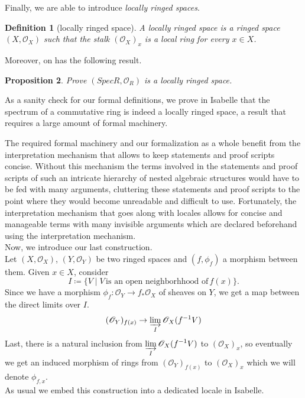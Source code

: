 \documentclass[12pt]{scrartcl}
\newtheorem{proposition}{Proposition}[section]
\newtheorem{definition}[proposition]{Definition}
\begin{document}

Finally, we are able to introduce \emph{locally ringed spaces}.

\begin{definition}[locally ringed space]
	A locally ringed space is a ringed space $(X, \mathscr{O}_X)$ such that the stalk $(\mathscr{O}_X)_x$ is a local ring for every $x \in X$.
\end{definition}


Moreover, on has the following result.

\begin{proposition}
	Prove $(Spec R, \mathscr{O}_R)$ is a locally ringed space.
\end{proposition}

As a sanity check for our formal definitions, we prove in Isabelle that the spectrum of a commutative ring is indeed a locally ringed space, a result that requires a large amount of formal machinery.


The required formal machinery and our formalization as a whole benefit from the interpretation mechanism that allows to keep statements and proof scripts concise. Without this mechanism the terms involved in the statements and proof scripts of such an intricate hierarchy of nested algebraic structures would have to be fed with many arguments, cluttering these statements and proof scripts to the point where they would become unreadable and difficult to use. Fortunately, the interpretation mechanism that goes along with locales allows for concise and manageable terms with many invisible arguments which are declared beforehand using the interpretation mechanism. \\   
Now, we introduce our last construction. \\
	Let $(X, \mathscr{O}_X)$, $(Y, \mathscr{O}_Y)$ be two ringed spaces and $(f, \phi_f)$ a morphism between them. Given $x \in X$, consider 
	\[
	I \coloneqq \lbrace V \mid V \, \text{is an open neighborhhood of}\, f(x) \rbrace .
	\]
	Since we have a morphism $\phi_f: \mathscr{O}_Y \rightarrow f_* \mathscr{O}_X $ of sheaves on $Y$, we get a map between the direct limits over $I$. 
	\[
	(\mathscr{O}_Y)_{f(x)} \rightarrow \displaystyle \varinjlim_I \mathscr{O}_X (f^{-1} V)
	\]
	Last, there is a natural inclusion from $\displaystyle \varinjlim_I \mathscr{O}_X (f^{-1} V)$ to $(\mathscr{O}_X)_x$, so eventually we get an induced morphism of rings from $(\mathscr{O}_Y)_{f(x)}$ to $(\mathscr{O}_X)_x$ which we will denote $\phi_{f, x}$. \\	
As usual we embed this construction into a dedicated locale in Isabelle.
\end{document}
